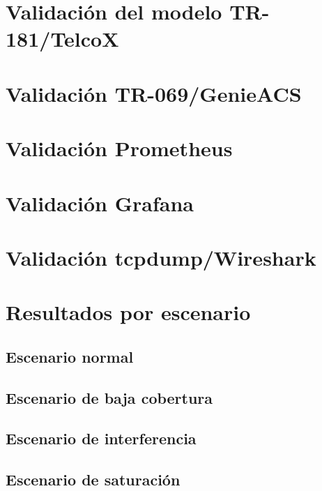 \section{Validación del modelo TR-181/TelcoX}
\label{sec:validacion-modelo-tr181-telcox}


\section{Validación TR-069/GenieACS}
\label{sec:validacion-tr069-genieacs}


\section{Validación Prometheus}
\label{sec:validacion-prometheus}


\section{Validación Grafana}
\label{sec:validacion-grafana}


\section{Validación tcpdump/Wireshark}
\label{sec:validacion-tcpdump-wireshark}


\section{Resultados por escenario}
\label{sec:resultados-por-escenario}

\subsection{Escenario normal}
\label{subsec:resultado-escenario-normal}

\subsection{Escenario de baja cobertura}
\label{subsec:resultado-escenario-baja-cobertura}

\subsection{Escenario de interferencia}
\label{subsec:resultado-escenario-interferencia}

\subsection{Escenario de saturación}
\label{subsec:resultado-escenario-saturacion}

